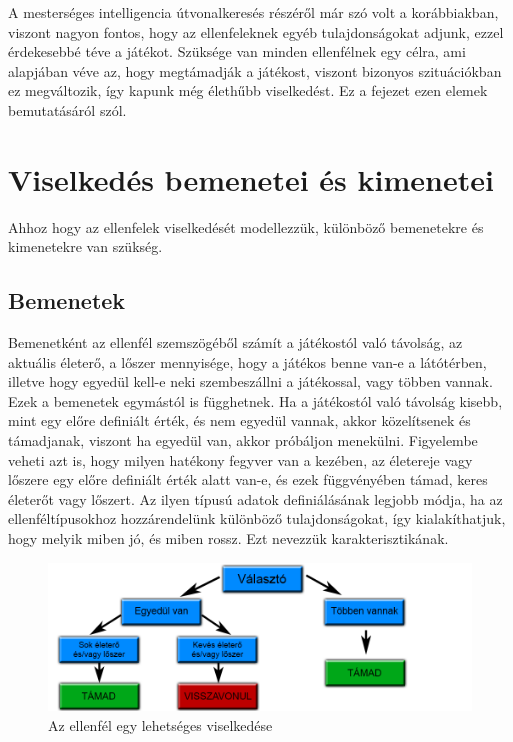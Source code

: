 \label{Chap:viselkedes}

A mesterséges intelligencia útvonalkeresés részéről már szó volt a korábbiakban, viszont nagyon fontos, hogy az ellenfeleknek egyéb tulajdonságokat adjunk, ezzel érdekesebbé téve a játékot. Szüksége van minden ellenfélnek egy célra, ami alapjában véve az, hogy megtámadják a játékost, viszont bizonyos szituációkban ez megváltozik, így kapunk még élethűbb viselkedést. Ez a fejezet ezen elemek bemutatásáról szól.

\section{Viselkedés bemenetei és kimenetei}

Ahhoz hogy az ellenfelek viselkedését modellezzük, különböző bemenetekre és kimenetekre van szükség.

\subsection{Bemenetek}
Bemenetként az ellenfél szemszögéből számít a játékostól való távolság, az aktuális életerő, a lőszer mennyisége, hogy a játékos benne van-e a látótérben, illetve hogy egyedül kell-e neki szembeszállni a játékossal, vagy többen vannak. Ezek a bemenetek egymástól is függhetnek. Ha a játékostól való távolság kisebb, mint egy előre definiált érték, és nem egyedül vannak, akkor közelítsenek és támadjanak, viszont ha egyedül van, akkor próbáljon menekülni. Figyelembe veheti azt is, hogy milyen hatékony fegyver van a kezében, az életereje vagy lőszere egy előre definiált érték alatt van-e, és ezek függvényében támad, keres életerőt vagy lőszert. Az ilyen típusú adatok definiálásának legjobb módja, ha az ellenféltípusokhoz hozzárendelünk különböző tulajdonságokat, így kialakíthatjuk, hogy melyik miben jó, és miben rossz. Ezt nevezzük karakterisztikának.

\begin{figure}[h]
\centering
\includegraphics[scale=0.38]{kepek/viselkedes.png}
\caption{Az ellenfél egy lehetséges viselkedése}
\label{fig:behavior}
\end{figure}

